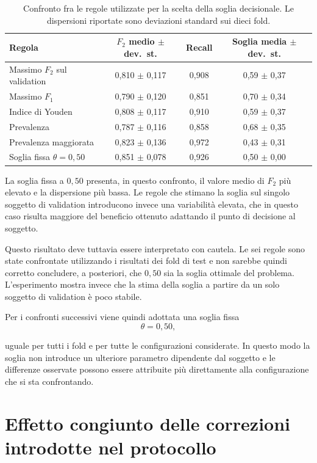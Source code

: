 \begin{table}[ht]
\centering
\caption{Confronto fra le regole utilizzate per la scelta della soglia
decisionale. Le dispersioni riportate sono deviazioni standard sui dieci fold.}
\label{tab:soglie}
\begin{tabular}{lccc}
\toprule
\textbf{Regola} &
\textbf{$F_2$ medio $\pm$ dev.\ st.} &
\textbf{Recall} &
\textbf{Soglia media $\pm$ dev.\ st.} \\
\midrule
Massimo $F_2$ sul validation
    & 0{,}810 $\pm$ 0{,}117 & 0{,}908 & 0{,}59 $\pm$ 0{,}37 \\
Massimo $F_1$
    & 0{,}790 $\pm$ 0{,}120 & 0{,}851 & 0{,}70 $\pm$ 0{,}34 \\
Indice di Youden
    & 0{,}808 $\pm$ 0{,}117 & 0{,}910 & 0{,}59 $\pm$ 0{,}37 \\
Prevalenza
    & 0{,}787 $\pm$ 0{,}116 & 0{,}858 & 0{,}68 $\pm$ 0{,}35 \\
Prevalenza maggiorata
    & 0{,}823 $\pm$ 0{,}136 & 0{,}972 & 0{,}43 $\pm$ 0{,}31 \\
Soglia fissa $\theta=0{,}50$
    & 0{,}851 $\pm$ 0{,}078 & 0{,}926 & 0{,}50 $\pm$ 0{,}00 \\
\bottomrule
\end{tabular}
\end{table}

La soglia fissa a $0{,}50$ presenta, in questo confronto, il valore medio di $F_2$ più elevato e la dispersione più bassa. Le regole che stimano la soglia sul singolo soggetto di validation introducono invece una variabilità elevata, che in questo caso risulta maggiore del beneficio ottenuto adattando il punto di decisione al soggetto.

Questo risultato deve tuttavia essere interpretato con cautela. Le sei regole sono state confrontate utilizzando i risultati dei fold di test e non sarebbe quindi corretto concludere, a posteriori, che $0{,}50$ sia la soglia ottimale del problema. L'esperimento mostra invece che la stima della soglia a partire da un solo soggetto di validation è poco stabile.

Per i confronti successivi viene quindi adottata una soglia fissa
\[
\theta = 0{,}50,
\]

uguale per tutti i fold e per tutte le configurazioni considerate. In questo modo la soglia non introduce un ulteriore parametro dipendente dal soggetto e le differenze osservate possono essere attribuite più direttamente alla configurazione che si sta confrontando.

\section{Effetto congiunto delle correzioni introdotte nel protocollo}
\label{sec:baseline}

